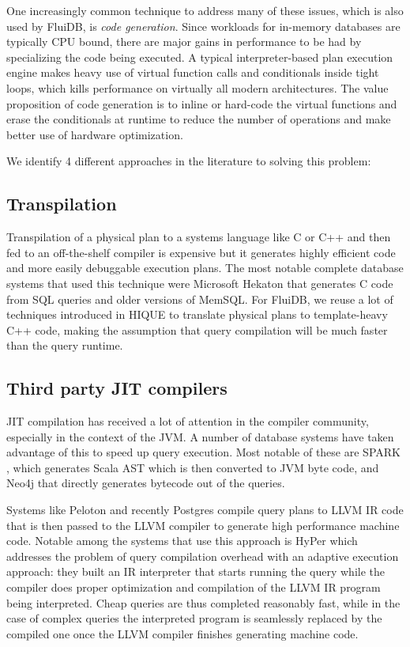 One increasingly common technique to address many of these issues,
which is also used by FluiDB, is \emph{code generation}. Since
workloads for in-memory databases are typically CPU bound, there are
major gains in performance to be had by specializing the code being
executed. A typical interpreter-based plan execution engine makes
heavy use of virtual function calls and conditionals inside tight
loops, which kills performance on virtually all modern
architectures. The value proposition of code generation is to inline
or hard-code the virtual functions and erase the conditionals at
runtime to reduce the number of operations and make better use of
hardware optimization.

We identify 4 different approaches in the literature to solving this
problem:

\subsection{Transpilation}
\label{sec:transpilation}

Transpilation of a physical plan to a systems language like C or C++
and then fed to an off-the-shelf compiler
\cite{krikellasGeneratingCodeHolistic2010} is expensive but it
generates highly efficient code and more easily debuggable execution
plans. The most notable complete database systems that used this
technique were Microsoft Hekaton that generates C code from SQL
queries and older versions of MemSQL. For FluiDB, we reuse a lot of
techniques introduced in HIQUE
\cite{krikellasGeneratingCodeHolistic2010} to translate physical plans
to template-heavy C++ code, making the assumption that query
compilation will be much faster than the query runtime.

\subsection{Third party JIT compilers}

JIT compilation has received a lot of attention in the compiler
community, especially in the context of the JVM. A number of database
systems have taken advantage of this to speed up query execution. Most
notable of these are SPARK \cite{armbrustSparkSQLRelational2015}, which
generates Scala AST which is then converted to JVM byte code, and
Neo4j that directly generates bytecode out of the queries.

Systems like Peloton \cite{menonRelaxedOperatorFusion2017} and
recently Postgres \cite{sharyginQueryCompilationPostgreSQL2017}
compile query plans to LLVM IR code that is then passed to the LLVM
compiler to generate high performance machine code. Notable among the
systems that use this approach is HyPer
\cite{neumannEvolutionCompilingQueryEngine} which addresses the
problem of query compilation overhead with an adaptive execution
approach: they built an IR interpreter that starts running the query
while the compiler does proper optimization and compilation of the
LLVM IR program being interpreted. Cheap queries are thus completed
reasonably fast, while in the case of complex queries the interpreted
program is seamlessly replaced by the compiled one once the LLVM
compiler finishes generating machine code.

